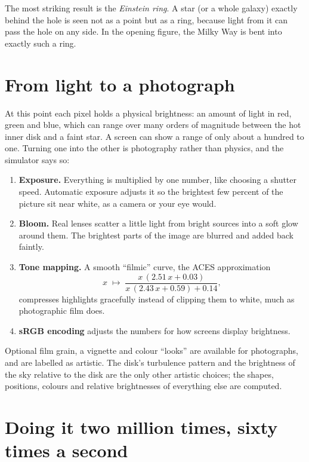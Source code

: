 \documentclass[11pt,a4paper]{article}
\begin{document}
The most striking result is the \emph{Einstein ring}. A star (or a whole galaxy) exactly
behind the hole is seen not as a point but as a ring, because light from it can pass the
hole on any side. In the opening figure, the Milky Way is bent into exactly such a ring.

\section{From light to a photograph}\label{sec:photo}

At this point each pixel holds a physical brightness: an amount of light in red, green and
blue, which can range over many orders of magnitude between the hot inner disk and a faint
star. A screen can show a range of only about a hundred to one. Turning one into the other
is photography rather than physics, and the simulator says so:
\begin{enumerate}
  \item \textbf{Exposure.} Everything is multiplied by one number, like choosing a
        shutter speed. Automatic exposure adjusts it so the brightest few percent of the
        picture sit near white, as a camera or your eye would.
  \item \textbf{Bloom.} Real lenses scatter a little light from bright sources into a soft
        glow around them. The brightest parts of the image are blurred and added back
        faintly.
  \item \textbf{Tone mapping.} A smooth ``filmic'' curve, the ACES approximation
        \[
          x \;\mapsto\; \frac{x\,(2.51\,x + 0.03)}{x\,(2.43\,x + 0.59) + 0.14},
        \]
        compresses highlights gracefully instead of clipping them to white, much as
        photographic film does.
  \item \textbf{sRGB encoding} adjusts the numbers for how screens display brightness.
\end{enumerate}
Optional film grain, a vignette and colour ``looks'' are available for photographs, and are
labelled as artistic. The disk's turbulence pattern and the brightness of the sky relative
to the disk are the only other artistic choices; the shapes, positions, colours and
relative brightnesses of everything else are computed.

\section{Doing it two million times, sixty times a second}\label{sec:gpu}
\end{document}
